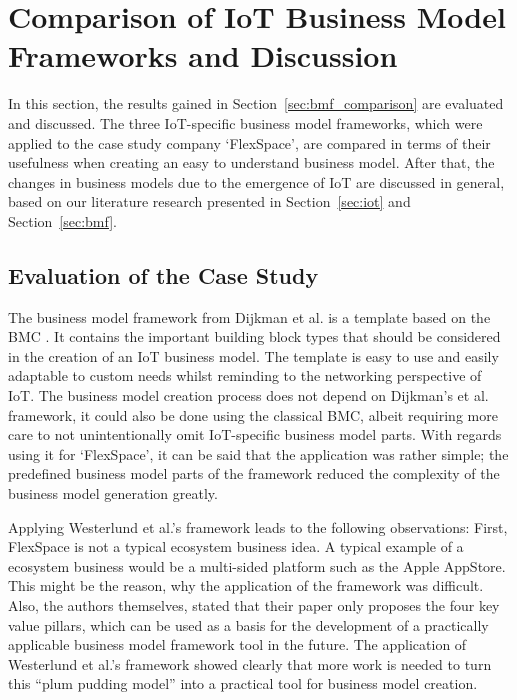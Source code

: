 \section{Comparison of IoT Business Model Frameworks and Discussion}
\label{sec:eval}
\vspace{-1em}
	In this section, the results gained in Section~\ref{sec:bmf_comparison} are evaluated and discussed. The three IoT-specific business model frameworks, which were applied to the case study company `FlexSpace', are compared in terms of their usefulness when creating an easy to understand business model. After that, the changes in business models due to the emergence of IoT are discussed in general, based on our literature research presented in Section~\ref{sec:iot} and Section~\ref{sec:bmf}.
	\vspace{-2em}

		\subsection{Evaluation of the Case Study}
		\vspace{-1em}
		The business model framework from Dijkman et al. \cite{dijkman} is a template based on the BMC \cite{bmc}. It contains the important building block types that should be considered in the creation of an IoT business model. The template is easy to use and easily adaptable to custom needs whilst reminding to the networking perspective of IoT. The business model creation process does not depend on Dijkman's et al. framework, it could also be done using the classical BMC, albeit requiring more care to not unintentionally omit IoT-specific business model parts. With regards using it for `FlexSpace', it can be said that the application was rather simple; the predefined business model parts of the framework reduced the complexity of the business model generation greatly.
		
		Applying Westerlund et al.'s framework leads to the following observations: First, FlexSpace is not a typical ecosystem business idea. A typical example of a ecosystem business would be a multi-sided platform such as the Apple AppStore. This might be the reason, why the application of the framework was difficult. Also, the authors themselves, stated that their paper only proposes the four key value pillars, which can be used as a basis for the development of a practically applicable business model framework tool in the future. The application of Westerlund et al.'s framework showed clearly that more work is needed to turn this ``plum pudding model'' \cite{westerlund} into a practical tool for business model creation.
		
